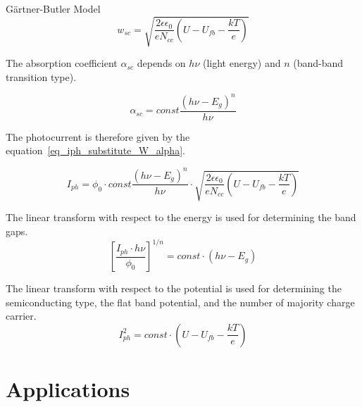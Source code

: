 \documentclass[10pt,compress,handout]{beamer}
\begin{document}
\begin{frame}[allowframebreaks=1.0]{Gärtner-Butler Model}
        \begin{equation}
            w_{sc} = \sqrt{ \frac{2\epsilon \epsilon _0}{e N_{cc}} (U-U_{fb}-\frac{kT}{e}) }
            \label{eq_space_charge_Schottky}
        \end{equation}
        
        The absorption coefficient $\alpha _{sc}$ depends on $h\nu$ (light energy) and $n$ (band-band transition type).

        \begin{equation}
            \alpha _{sc} = const \frac{(h\nu - E_g)^n}{h\nu}
            \label{eq_absorption_coef}
        \end{equation}

        \framebreak
        The photocurrent is therefore given by the 
        equation~\ref{eq_iph_substitute_W_alpha}. 

        \begin{equation}
            I_{ph} = \phi _0 \cdot const \frac{(h\nu - E_g)^n}{h\nu}
                \cdot \sqrt{ \frac{2\epsilon \epsilon _0}{e N_{cc}} (U-U_{fb}-\frac{kT}{e}) }
            \label{eq_iph_substitute_W_alpha}
        \end{equation}
        
        The linear transform with respect to the energy is used for determining the band gaps. 
        \begin{equation}
            \left[ \frac{I_{ph} \cdot h\nu}{\phi _0} \right] ^{1/n} = const \cdot (h\nu - E_g)
            \label{eq_iph_linear_transform}
        \end{equation}
        
        The linear transform with respect to the potential  is used for determining 
        the semiconducting type, the flat band potential, 
        and the number of majority charge carrier.
        \begin{equation}
            I_{ph}^2 = const \cdot (U-U_{fb}-\frac{kT}{e})
            \label{eq_iph_linear_transform_potential}
        \end{equation}
    \end{frame}



\section{Applications}
\end{document}
